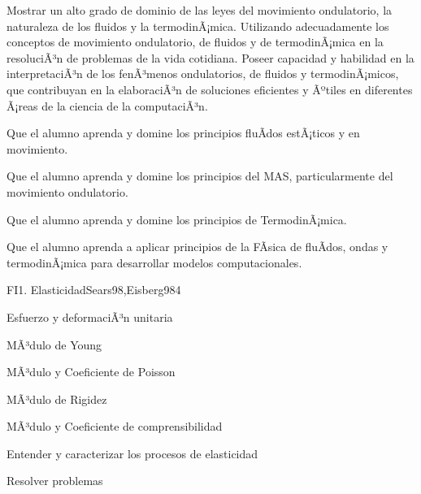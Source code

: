 \begin{syllabus}


\begin{justification}
Mostrar un alto grado de dominio de las leyes del movimiento ondulatorio, la naturaleza de los fluidos y la termodinÃ¡mica. Utilizando adecuadamente los conceptos de movimiento ondulatorio, de fluidos y de termodinÃ¡mica en la resoluciÃ³n de problemas de la vida cotidiana. Poseer capacidad y habilidad en la interpretaciÃ³n de los fenÃ³menos ondulatorios, de fluidos y termodinÃ¡micos, que contribuyan en la elaboraciÃ³n de soluciones eficientes y Ãºtiles en diferentes Ã¡reas de la ciencia de la computaciÃ³n.
\end{justification}

\begin{goals}
\item  Que el alumno aprenda y domine los principios fluÃ­dos estÃ¡ticos y en movimiento.
\item  Que el alumno aprenda y domine los principios del MAS, particularmente del movimiento ondulatorio.
\item  Que el alumno aprenda y domine los principios de TermodinÃ¡mica.
\item  Que el alumno aprenda a aplicar principios de la FÃ­sica de fluÃ­dos, ondas y termodinÃ¡mica para desarrollar modelos computacionales.
\end{goals}

\begin{outcomes}
\end{outcomes}

\begin{unit}{FI1. Elasticidad}{Sears98,Eisberg98}{4}
\begin{topics}
         \item  Esfuerzo y deformaciÃ³n unitaria
	 \item  MÃ³dulo de Young
         \item  MÃ³dulo y Coeficiente de Poisson
	 \item  MÃ³dulo de Rigidez
         \item  MÃ³dulo y Coeficiente de comprensibilidad
   \end{topics}

   \begin{unitgoals}
         \item  Entender y caracterizar los procesos de elasticidad
         \item  Resolver problemas
   \end{unitgoals}
\end{unit}


\end{syllabus}
